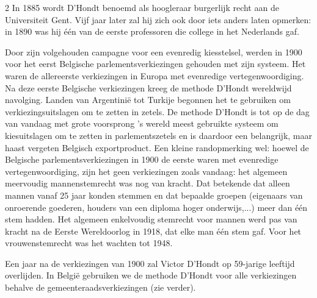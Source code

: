 \begin{multicols}{2}
In 1885 wordt D'Hondt benoemd als hoogleraar burgerlijk recht aan de Universiteit Gent. Vijf jaar later zal hij zich ook door iets anders laten opmerken: in 1890 was hij één van de eerste professoren die college in het Nederlands gaf.

Door zijn volgehouden campagne voor een evenredig kiesstelsel, werden in 1900 voor het eerst Belgische parlementsverkiezingen gehouden met zijn systeem. Het waren de allereerste verkiezingen in Europa met evenredige vertegenwoordiging. Na deze eerste Belgische verkiezingen kreeg de methode D'Hondt wereldwijd navolging. Landen van Argentinië tot Turkije begonnen het te gebruiken om verkiezingsuitslagen om te zetten in zetels. De methode D'Hondt is tot op de dag van vandaag met grote voorsprong 's wereld meest gebruikte systeem om kiesuitslagen om te zetten in parlementszetels en is daardoor een belangrijk, maar haast vergeten Belgisch exportproduct. Een kleine randopmerking wel: hoewel de Belgische parlementsverkiezingen in 1900 de eerste waren met evenredige vertegenwoordiging, zijn het geen verkiezingen zoals vandaag: het algemeen meervoudig mannenstemrecht was nog van kracht. Dat betekende dat alleen mannen vanaf 25 jaar konden stemmen en dat bepaalde groepen (eigenaars van onroerende goederen, houders van een diploma hoger onderwijs,...) meer dan één stem hadden. Het algemeen enkelvoudig stemrecht voor mannen werd pas van kracht na de Eerste Wereldoorlog in 1918, dat elke man één stem gaf. Voor het vrouwenstemrecht was het wachten tot 1948.

Een jaar na de verkiezingen van 1900 zal Victor D'Hondt op 59-jarige leeftijd overlijden. In België gebruiken we de methode D'Hondt voor alle verkiezingen behalve de gemeenteraadsverkiezingen (zie verder).
\end{multicols}

